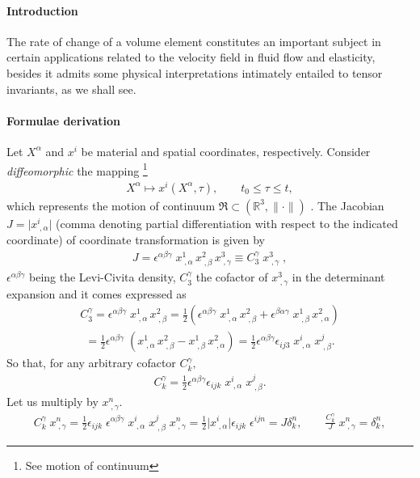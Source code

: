 \documentclass[12pt]{article}
\begin{document}
\paragraph{Introduction}
The rate of change of a volume element constitutes an important subject in certain applications related to the velocity field in fluid flow and elasticity, 
besides it admits some physical interpretations intimately entailed to  
tensor invariants, as we shall see.
\paragraph{Formulae derivation} 
Let $X^\alpha$ and $x^i$ be material and spatial coordinates, respectively. Consider  {\em diffeomorphic} the mapping \footnote{See motion of continuum}
\begin{align*}
X^\alpha \mapsto x^i(X^\alpha,\tau), \qquad  t_0\leq\tau\leq{t},
\end{align*} 
which represents the motion of continuum $\Re\subset(\mathbb{R}^3,\lVert\cdot\rVert)$ . The Jacobian $J=\vert x^i_{\;,\alpha}\vert$ (comma denoting partial differentiation with respect to the indicated coordinate) of coordinate transformation is given by
\begin{align*}
J=\epsilon^{\alpha\beta\gamma}\;x^1_{\;,\alpha}\,x^2_{\;,\beta}\,x^3_{\;,\gamma}
\equiv C^\gamma_3 \;x^3_{\;,\gamma}\;,
\end{align*}
$\epsilon^{\alpha\beta\gamma}$ being the Levi-Civita density, $C^\gamma_3$ the cofactor of $x^3_{\;,\gamma}$ in the determinant expansion and it comes expressed as
\begin{align*}
C^\gamma_3=\epsilon^{\alpha\beta\gamma}\;x^1_{\;,\alpha}\,x^2_{\;,\beta}=
\frac{1}{2} (\epsilon^{\alpha\beta\gamma}\;x^1_{\;,\alpha}\,x^2_{\;,\beta}+
\epsilon^{\beta\alpha
\gamma}\;x^1_{\;,\beta}\,x^2_{\;,\alpha})
\end{align*}
\begin{align*}
=\frac{1}{2}\epsilon^{\alpha\beta\gamma} 
\;(x^1_{\;,\alpha}\,x^2_{\;,\beta}-x^1_{\;,\beta}\,x^2_{\;,\alpha})=\frac{1}{2}
\epsilon^{\alpha\beta\gamma}\epsilon_{ij3}\;x^i_{\;,\alpha}\;x^j_{\;,\beta}.
\end{align*}
So that, for any arbitrary cofactor $C^\gamma_k,$
\begin{align*}
C^\gamma_k=\frac{1}{2}
\epsilon^{\alpha\beta\gamma}\epsilon_{ijk}\;x^i_{\;,\alpha}\;x^j_{\;,\beta}.
\end{align*}
Let us multiply by $x^n_{\;,\gamma}.$
\begin{align}
C^\gamma_k \;x^n_{\;,\gamma}=\frac{1}{2}
\epsilon_{ijk}\;\epsilon^{\alpha\beta\gamma}\;x^i_{\;,\alpha}\;x^j_{\;,\beta}
\;x^n_{\;,\gamma} =\frac{1}{2}\vert{x}^i_{\;,\alpha}\vert\epsilon_{ijk}\;\epsilon^{ijn}=
J\delta^n_k, \qquad \frac{C^\gamma_k}{J}\;x^n_{\;,\gamma}=\delta^n_k,
\end{align}
\end{document}
